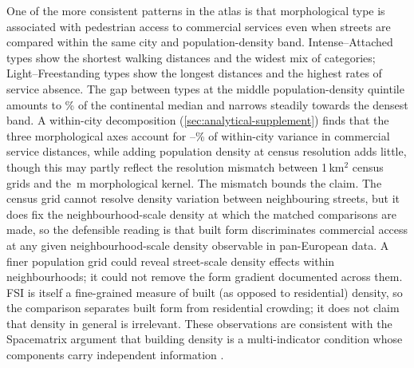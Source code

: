 \documentclass[review,authoryear]{elsarticle}
\begin{document}
One of the more consistent patterns in the atlas is that morphological type is associated with pedestrian access to commercial services even when streets are compared within the same city and population-density band. Intense--Attached types show the shortest walking distances and the widest mix of categories; Light--Freestanding types show the longest distances and the highest rates of service absence. The gap between types at the middle population-density quintile amounts to \dqRetailQThreegapPct\% of the continental median and narrows steadily towards the densest band. A within-city decomposition (\ref{sec:analytical-supplement}) finds that the three morphological axes account for \rSqMorphMin--\rSqMorphMax\% of within-city variance in commercial service distances, while adding population density at census resolution adds little, though this may partly reflect the resolution mismatch between 1\,km$^2$ census grids and the \,m morphological kernel. The mismatch bounds the claim. The census grid cannot resolve density variation between neighbouring streets, but it does fix the neighbourhood-scale density at which the matched comparisons are made, so the defensible reading is that built form discriminates commercial access at any given neighbourhood-scale density observable in pan-European data. A finer population grid could reveal street-scale density effects within neighbourhoods; it could not remove the form gradient documented across them. FSI is itself a fine-grained measure of built (as opposed to residential) density, so the comparison separates built form from residential crowding; it does not claim that density in general is irrelevant. These observations are consistent with the Spacematrix argument that building density is a multi-indicator condition whose components carry independent information \citep{berghauser2010spacematrix, godoyshimizu2021density}.
\end{document}

